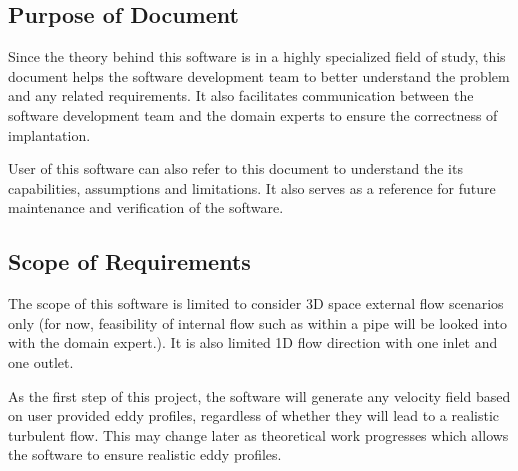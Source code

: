 \documentclass[12pt]{article}
\begin{document}
\subsection{Purpose of Document}
Since the theory behind this software is in a highly specialized field of study, this document helps the software development team to better understand the problem and any related requirements. It also facilitates communication between the software development team and the domain experts to ensure the correctness of implantation.

User of this software can also refer to this document to understand the its capabilities, assumptions and limitations. It also serves as a reference for future maintenance and verification of the software.


\subsection{Scope of Requirements} 

The scope of this software is limited to consider 3D space external flow scenarios only (for now, feasibility of internal flow such as within a pipe will be looked into with the domain expert.). It is also limited 1D flow direction with one inlet and one outlet.

As the first step of this project, the software will generate any velocity field based on user provided eddy profiles, regardless of whether they will lead to a realistic turbulent flow. This may change later as theoretical work progresses which allows the software to ensure realistic eddy profiles.

\end{document}
